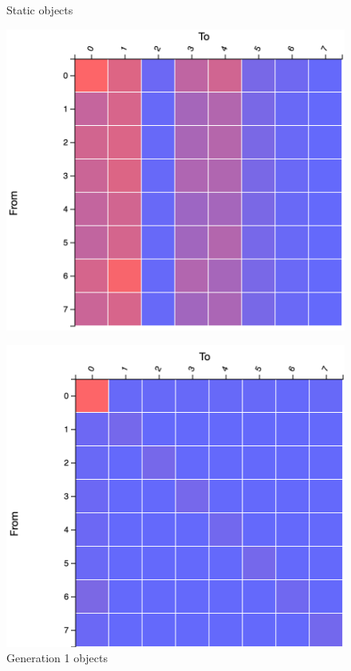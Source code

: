\documentclass{paper}\usepackage{graphicx}
\begin{document}
\begin{figure}[!htb]
    \centering
    \begin{multicols}{3}
    \caption{Static objects}
    \label{fig:prsaa_static}
    \includegraphics[width=\linewidth]{Paper/images/prsa/prsa_static.png}\par
    \caption{Generation 1 objects}
    \label{fig:prsa_gen1}
    \includegraphics[width=\linewidth]{Paper/images/prsa/prsa_gen1.png}\par

\end{multicols}
\end{figure}
\end{document}
